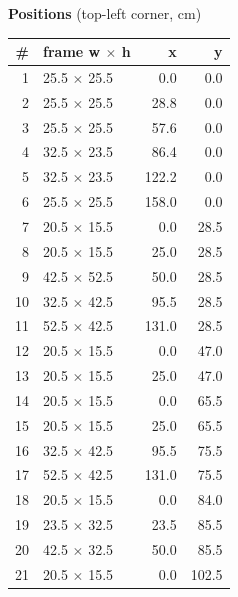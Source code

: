 \documentclass[a4paper,landscape,10pt]{article}
\begin{document}
\begin{minipage}[t]{0.25\textwidth}
\vspace{8pt}
{\bfseries Positions} (top-left corner, cm)\\[2pt]
\tiny
\begin{tabular}{@{}r l r r@{}}
\toprule
\# & frame w $\times$ h & x & y \\
\midrule
1 & 25.5 $\times$ 25.5 & 0.0 & 0.0 \\
2 & 25.5 $\times$ 25.5 & 28.8 & 0.0 \\
3 & 25.5 $\times$ 25.5 & 57.6 & 0.0 \\
4 & 32.5 $\times$ 23.5 & 86.4 & 0.0 \\
5 & 32.5 $\times$ 23.5 & 122.2 & 0.0 \\
6 & 25.5 $\times$ 25.5 & 158.0 & 0.0 \\
7 & 20.5 $\times$ 15.5 & 0.0 & 28.5 \\
8 & 20.5 $\times$ 15.5 & 25.0 & 28.5 \\
9 & 42.5 $\times$ 52.5 & 50.0 & 28.5 \\
10 & 32.5 $\times$ 42.5 & 95.5 & 28.5 \\
11 & 52.5 $\times$ 42.5 & 131.0 & 28.5 \\
12 & 20.5 $\times$ 15.5 & 0.0 & 47.0 \\
13 & 20.5 $\times$ 15.5 & 25.0 & 47.0 \\
14 & 20.5 $\times$ 15.5 & 0.0 & 65.5 \\
15 & 20.5 $\times$ 15.5 & 25.0 & 65.5 \\
16 & 32.5 $\times$ 42.5 & 95.5 & 75.5 \\
17 & 52.5 $\times$ 42.5 & 131.0 & 75.5 \\
18 & 20.5 $\times$ 15.5 & 0.0 & 84.0 \\
19 & 23.5 $\times$ 32.5 & 23.5 & 85.5 \\
20 & 42.5 $\times$ 32.5 & 50.0 & 85.5 \\
21 & 20.5 $\times$ 15.5 & 0.0 & 102.5 \\
\bottomrule
\end{tabular}
\end{minipage}
\clearpage
\end{document}
